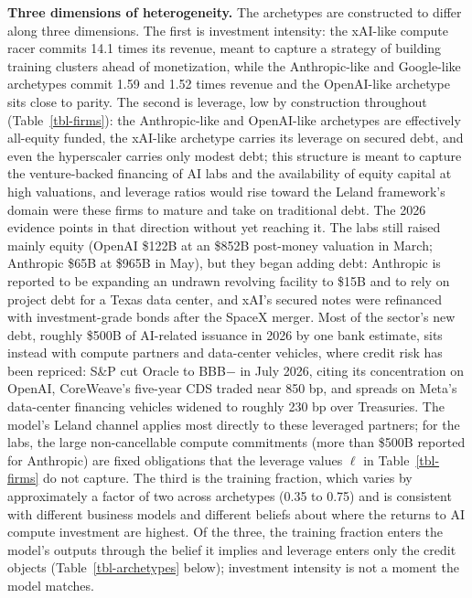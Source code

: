 \documentclass[
  11pt,
  letterpaper,
]{scrartcl}
\begin{document}
\textbf{Three dimensions of heterogeneity.} The archetypes are
constructed to differ along three dimensions. The first is investment
intensity: the xAI-like compute racer commits 14.1 times its revenue,
meant to capture a strategy of building training clusters ahead of
monetization, while the Anthropic-like and Google-like archetypes commit
1.59 and 1.52 times revenue and the OpenAI-like archetype sits close to
parity. The second is leverage, low by construction throughout
(Table~\ref{tbl-firms}): the Anthropic-like and OpenAI-like archetypes
are effectively all-equity funded, the xAI-like archetype carries its
leverage on secured debt, and even the hyperscaler carries only modest
debt; this structure is meant to capture the venture-backed financing of
AI labs and the availability of equity capital at high valuations, and
leverage ratios would rise toward the Leland framework's domain were
these firms to mature and take on traditional debt. The 2026 evidence
points in that direction without yet reaching it. The labs still raised
mainly equity (OpenAI \$122B at an \$852B post-money valuation in March;
Anthropic \$65B at \$965B in May), but they began adding debt: Anthropic
is reported to be expanding an undrawn revolving facility to \$15B and
to rely on project debt for a Texas data center, and xAI's secured notes
were refinanced with investment-grade bonds after the SpaceX merger.
Most of the sector's new debt, roughly \$500B of AI-related issuance in
2026 by one bank estimate, sits instead with compute partners and
data-center vehicles, where credit risk has been repriced: S\&P cut
Oracle to BBB\(-\) in July 2026, citing its concentration on OpenAI,
CoreWeave's five-year CDS traded near 850 bp, and spreads on Meta's
data-center financing vehicles widened to roughly 230 bp over
Treasuries. The model's Leland channel applies most directly to these
leveraged partners; for the labs, the large non-cancellable compute
commitments (more than \$500B reported for Anthropic) are fixed
obligations that the leverage values \(\ell\) in Table~\ref{tbl-firms}
do not capture. The third is the training fraction, which varies by
approximately a factor of two across archetypes (0.35 to 0.75) and is
consistent with different business models and different beliefs about
where the returns to AI compute investment are highest. Of the three,
the training fraction enters the model's outputs through the belief it
implies and leverage enters only the credit objects
(Table~\ref{tbl-archetypes} below); investment intensity is not a moment
the model matches.
\end{document}
